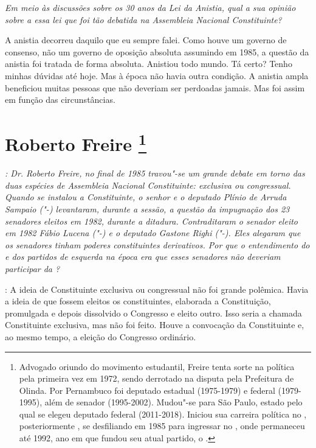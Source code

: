 \medskip

\emph{Em meio às discussões sobre os 30 anos da Lei da Anistia, qual a
sua opinião sobre a essa lei que foi tão debatida na Assembleia Nacional
Constituinte?}

A anistia decorreu daquilo que eu sempre falei. Como
houve um governo de consenso, não um governo de oposição absoluta
assumindo em 1985, a questão da anistia foi tratada de forma absoluta.
Anistiou todo mundo. Tá certo? Tenho minhas dúvidas até hoje. Mas à
época não havia outra condição. A anistia ampla beneficiou muitas
pessoas que não deveriam ser perdoadas jamais. Mas foi assim em função
das circunstâncias.

\chapter{Roberto Freire
\footnote{Advogado oriundo do movimento estudantil, Freire tenta sorte na
política pela primeira vez em 1972, sendo derrotado na disputa pela
Prefeitura de Olinda. Por Pernambuco foi deputado estadual (1975-1979) e
federal (1979-1995), além de senador (1995-2002). Mudou"-se para São
Paulo, estado pelo qual se elegeu deputado federal (2011-2018). Iniciou
sua carreira política no , posteriormente , se desfiliando em
1985 para ingressar no , onde permaneceu até 1992, ano em que fundou
seu atual partido, o .}}

\emph{: Dr. Roberto Freire, no final de 1985 travou"-se um grande debate
em torno das duas espécies de Assembleia Nacional Constituinte:
exclusiva ou congressual. Quando se instalou a Constituinte, o senhor e
o deputado Plínio de Arruda Sampaio ("-) levantaram, durante a
sessão, a questão da impugnação dos 23 senadores eleitos em 1982,
durante a ditadura. Contraditaram o senador eleito em 1982 Fábio Lucena
("-) e o deputado Gastone Righi ("-). Eles alegaram que os
senadores tinham poderes constituintes derivativos. Por que o
entendimento do  e dos partidos de esquerda na época era que esses
senadores não deveriam participar da ?}

: A ideia de Constituinte exclusiva ou congressual não
foi grande polêmica. Havia a ideia de que fossem eleitos os
constituintes, elaborada a Constituição, promulgada e depois dissolvido
o Congresso e eleito outro. Isso seria a chamada Constituinte exclusiva,
mas não foi feito. Houve a convocação da Constituinte e, ao mesmo tempo,
a eleição do Congresso ordinário.

